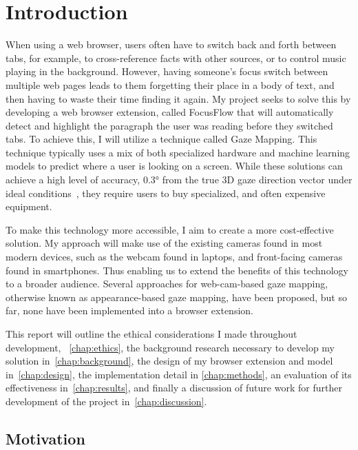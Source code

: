 \documentclass{report}
\begin{document}
\tableofcontents

\chapter{Introduction}
\label{chap:intro}
\noindent
When using a web browser, users often have to switch back and forth between tabs, for example, to cross-reference facts with other sources, or to control music playing in the background. However, having someone's focus switch between multiple web pages leads to them forgetting their place in a body of text, and then having to waste their time finding it again. My project seeks to solve this by developing a web browser extension, called FocusFlow that will automatically detect and highlight the paragraph the user was reading before they switched tabs. To achieve this, I will utilize a technique called Gaze Mapping. This technique typically uses a mix of both specialized hardware and machine learning models to predict where a user is looking on a screen. While these solutions can achieve a high level of accuracy, \(\ang{0.3}\) from the true 3D gaze direction vector under ideal conditions~\cite{tobiiprofusion}, they require users to buy specialized, and often expensive equipment.

To make this technology more accessible, I aim to create a more cost-effective solution. My approach will make use of the existing cameras found in most modern devices, such as the webcam found in laptops, and front-facing cameras found in smartphones. Thus enabling us to extend the benefits of this technology to a broader audience. Several approaches for web-cam-based gaze mapping, otherwise known as appearance-based gaze mapping, have been proposed, but so far, none have been implemented into a browser extension. 

This report will outline the ethical considerations I made throughout development, ~\autoref{chap:ethics}, the background research necessary to develop my solution in~\autoref{chap:background}, the design of my browser extension and model in~\autoref{chap:design}, the implementation detail in \autoref{chap:methods}, an evaluation of its effectiveness in~\autoref{chap:results}, and finally a discussion of future work for further development of the project in~\autoref{chap:discussion}.


\section{Motivation}
\end{document}
